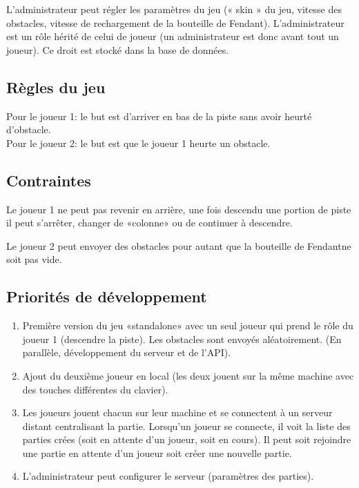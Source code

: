 \documentclass[a4paper,12pt]{article}
\begin{document}
	L'administrateur peut régler les paramètres du jeu (« skin » du jeu, vitesse des obstacles, vitesse de rechargement de la bouteille de Fendant\texttrademark). L'administrateur est un rôle hérité de celui de joueur (un administrateur est donc avant tout un joueur). Ce droit est stocké dans la base de données.
	
	
	\subsection{Règles du jeu}
	Pour le joueur 1: le but est d'arriver en bas de la piste sans avoir heurté d'obstacle. \\
	Pour le joueur 2: le but est que le joueur 1 heurte un obstacle.
	
	
	\subsection{Contraintes}
	Le joueur 1 ne peut pas revenir en arrière, une fois descendu une portion de piste il peut s'arrêter, changer de «colonne» ou de continuer à descendre. \par
	
	Le joueur 2 peut envoyer des obstacles pour autant que la bouteille de Fendant\texttrademark ne soit pas vide.
	
	
	\subsection{Priorités de développement}
	\begin{enumerate}
		\item Première version du jeu «standalone» avec un seul joueur qui prend le rôle du joueur 1 (descendre la piste). Les obstacles sont envoyés aléatoirement. (En parallèle, développement du serveur et de l'API).
		\item Ajout du deuxième joueur en local (les deux jouent sur la même machine avec des touches différentes du clavier).
		\item Les joueurs jouent chacun sur leur machine et se connectent à un serveur distant centralisant la partie. Lorsqu'un joueur se connecte, il voit la liste des parties crées (soit en attente d'un joueur, soit en cours). Il peut soit rejoindre une partie en attente d'un joueur soit créer une nouvelle partie.
		\item L'administrateur peut configurer le serveur (paramètres des parties).
	\end{enumerate}
	
\end{document}
